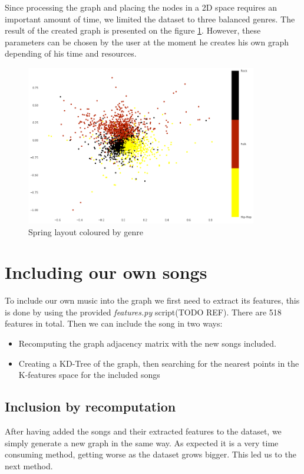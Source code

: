 \documentclass[11pt,a4paper,twoside]{article}
\begin{document}
Since processing the graph and placing the nodes in a 2D space requires an important amount of time, we limited the dataset to three balanced genres. The result of the created graph is presented on the figure \ref{fig:spring_layout}. However, these parameters can be chosen by the user at the moment he creates his own graph depending of his time and resources.

\begin{figure}[H]
\centering
\includegraphics[width=0.9\textwidth] {figures/graph_2}
\caption{Spring layout coloured by genre}
\label{fig:spring_layout}
\end{figure}
\section{Including our own songs}

To include our own music into the graph we first need to extract its features, this is done by using
the provided \textit{features.py} script(TODO REF). There are 518 features in total.
Then we can include the song in two ways:
\begin{itemize}
\item Recomputing the graph adjacency matrix with the new songs included.
\newpage
\item Creating a KD-Tree of the graph, then searching for the nearest points in the K-features space for the included songs
\end{itemize}


\subsection{Inclusion by recomputation}
After having added the songs and their extracted features to the dataset, we simply generate a new graph in the same way. As expected it is a very time consuming method, getting worse as the dataset grows bigger. This led us to the next method. 
\end{document}
